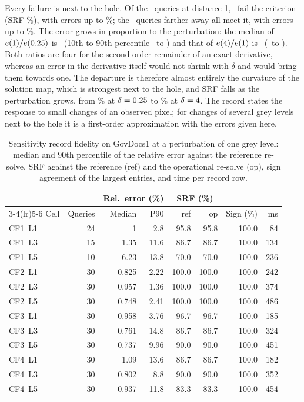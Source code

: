 \documentclass[final,3p]{elsarticle}
\begin{document}
Every failure is next to the hole. Of the \recNearN\ queries at distance 1, \recNearFail\ fail the criterion (SRF \recNearSrf\%), with errors up to \recNearErrMax\%; the \recFarN\ queries farther away all meet it, with errors up to \recFarErrMax\%. The error grows in proportion to the perturbation: the median of $e(1)/e(0.25)$ is \recRatioLow\ (10th to 90th percentile \recRatioLowPTen\ to \recRatioLowPNinety) and that of $e(4)/e(1)$ is \recRatioHigh\ (\recRatioHighPTen\ to \recRatioHighPNinety). Both ratios are four for the second-order remainder of an exact derivative, whereas an error in the derivative itself would not shrink with $\delta$ and would bring them towards one. The departure is therefore almost entirely the curvature of the solution map, which is strongest next to the hole, and SRF falls as the perturbation grows, from \recSrfSmallDelta\% at $\delta = 0.25$ to \recSrfLargeDelta\% at $\delta = 4$. The record states the response to small changes of an observed pixel; for changes of several grey levels next to the hole it is a first-order approximation with the errors given here.

\begin{table}[!t]
\centering
\caption{Sensitivity record fidelity on GovDocs1 at a perturbation of one grey level: median and 90th percentile of the relative error against the reference re-solve, SRF against the reference (ref) and the operational re-solve (op), sign agreement of the largest entries, and time per record row.}
\label{tab:fidelity}
\footnotesize
\setlength{\tabcolsep}{5pt}
\begin{tabular}{@{}l r r r r r r r@{}}
\toprule
 & & \multicolumn{2}{c}{Rel.\ error (\%)} & \multicolumn{2}{c}{SRF (\%)} & & \\
\cmidrule(lr){3-4}\cmidrule(lr){5-6}
Cell & Queries & Median & P90 & ref & op & Sign (\%) & ms \\
\midrule
CF1~L1 & 24 & 1 & 2.8 & 95.8 & 95.8 & 100.0 & 84 \\
CF1~L3 & 15 & 1.35 & 11.6 & 86.7 & 86.7 & 100.0 & 134 \\
CF1~L5 & 10 & 6.23 & 13.8 & 70.0 & 70.0 & 100.0 & 236 \\
\midrule
CF2~L1 & 30 & 0.825 & 2.22 & 100.0 & 100.0 & 100.0 & 242 \\
CF2~L3 & 30 & 0.957 & 1.36 & 100.0 & 100.0 & 100.0 & 374 \\
CF2~L5 & 30 & 0.748 & 2.41 & 100.0 & 100.0 & 100.0 & 486 \\
\midrule
CF3~L1 & 30 & 0.958 & 3.76 & 96.7 & 96.7 & 100.0 & 185 \\
CF3~L3 & 30 & 0.761 & 14.8 & 86.7 & 86.7 & 100.0 & 324 \\
CF3~L5 & 30 & 0.737 & 9.96 & 90.0 & 90.0 & 100.0 & 451 \\
\midrule
CF4~L1 & 30 & 1.09 & 13.6 & 86.7 & 86.7 & 100.0 & 182 \\
CF4~L3 & 30 & 0.802 & 8.8 & 90.0 & 90.0 & 100.0 & 352 \\
CF4~L5 & 30 & 0.937 & 11.8 & 83.3 & 83.3 & 100.0 & 454 \\
\bottomrule
\end{tabular}
\end{table}
\end{document}
